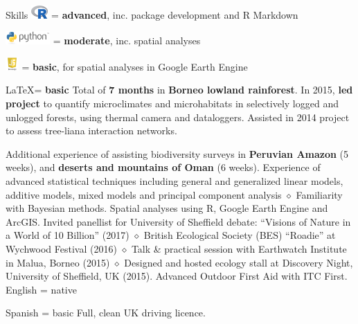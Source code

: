 
\begin{rubric}{Skills}
    \includegraphics[height=0.5cm]{Rlogo.png} = \textbf {advanced}, inc. package development and R Markdown
    \par \includegraphics[height=0.5cm]{python-logo.png} = \textbf{moderate}, inc. spatial analyses
    \par \includegraphics[height=0.5cm]{js-logo.jpeg} = \textbf{basic}, for spatial analyses in Google Earth Engine
    \par \LaTeX = \textbf{basic}
\entry*[Fieldwork]
    Total of \textbf{7 months} in \textbf{Borneo lowland rainforest}. In 2015, \textbf{led project} to quantify microclimates and microhabitats in selectively logged and unlogged forests, using thermal camera and dataloggers. Assisted in 2014 project to assess tree-liana interaction networks.
    \par \hfill
    \par Additional experience of assisting biodiversity surveys in \textbf{Peruvian Amazon} (5 weeks), and \textbf{deserts and mountains of Oman} (6 weeks).
	Experience of advanced statistical techniques including general and generalized linear models, additive models, mixed models and principal component analysis $\diamond$ Familiarity with Bayesian methods.
\entry*[GIS]
	Spatial analyses using R, Google Earth Engine and ArcGIS.
	Invited panellist for University of Sheffield debate: ``Visions of Nature in a World of 10 Billion'' (2017) $\diamond$ British Ecological Society (BES) ``Roadie'' at Wychwood Festival (2016) $\diamond$ Talk \& practical session with Earthwatch Institute in Malua, Borneo (2015) $\diamond$ Designed and hosted ecology stall at Discovery Night, University of Sheffield, UK (2015).
	Advanced Outdoor First Aid with ITC First.
\entry*[Languages]
	English = native 
	\par Spanish = basic
\entry*[Driving]
	Full, clean UK driving licence.
\end{rubric}
